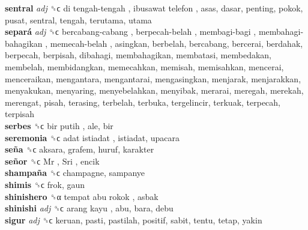 \textbf{sentral} \emph{adj}  ␝ϲ   di tengah-tengah ,  ibusawat telefon , asas, dasar, penting, pokok, pusat, sentral, tengah, terutama, utama  \\
\textbf{separá} \emph{adj}  ␝ϲ   bercabang-cabang ,  berpecah-belah ,  membagi-bagi ,  membahagi-bahagikan ,  memecah-belah , asingkan, berbelah, bercabang, bercerai, berdahak, berpecah, berpisah, dibahagi, membahagikan, membatasi, membedakan, membelah, membidangkan, memecahkan, memisah, memisahkan, mencerai, menceraikan, mengantara, mengantarai, mengasingkan, menjarak, menjarakkan, menyakukan, menyaring, menyebelahkan, menyibak, merarai, meregah, merekah, merengat, pisah, terasing, terbelah, terbuka, tergelincir, terkuak, terpecah, terpisah  \\
\textbf{serbes} ␝ϲ   bir putih , ale, bir  \\
\textbf{seremonia} ␝ϲ   adat istiadat , istiadat, upacara  \\
\textbf{seña} ␝ϲ  aksara, grafem, huruf, karakter  \\
\textbf{señor} ␝ϲ   Mr ,  Sri , encik  \\
\textbf{shampaña} ␝ϲ  champagne, sampanye  \\
\textbf{shimis} ␝ϲ  frok, gaun  \\
\textbf{shinishero} ␝α   tempat abu rokok , asbak  \\
\textbf{shinishi} \emph{adj}  ␝ϲ   arang kayu , abu, bara, debu  \\
\textbf{sigur} \emph{adj}  ␝ϲ  keruan, pasti, pastilah, positif, sabit, tentu, tetap, yakin  \\
